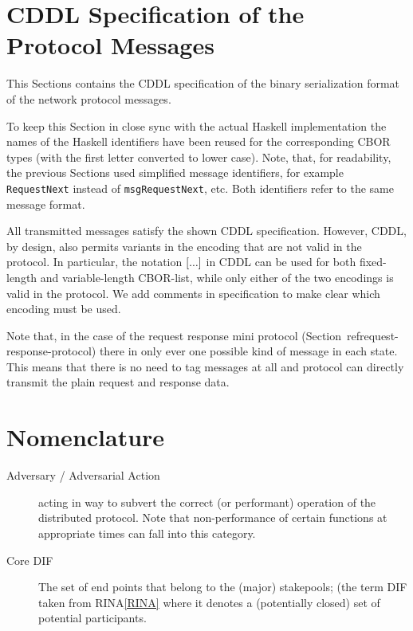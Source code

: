 \documentclass{report}
\newcommand{\wip}[1]{\color{magenta}{#1}\color{black}}
\theoremstyle{definition}{
  \newtheorem{lemma}{Lemma}[section] %
  \newtheorem{definition}[lemma]{Definition}
}
\theoremstyle{theorem}{
  \newtheorem{invariant}[lemma]{Invariant}
  \newtheorem{proofobligation}[lemma]{Proof Obligation}
}
\numberwithin{equation}{lemma}
\begin{document}
\appendix
\section{CDDL Specification of the Protocol Messages}
\label{included-cddl}
\label{CBOR-section}
This Sections contains the CDDL\cite{cddl} specification
of the binary serialization format of the network protocol messages.

To keep this Section in close sync with the actual Haskell implementation
the names of the Haskell identifiers have been reused for the corresponding
CBOR types (with the first letter converted to lower case).
Note, that, for readability, the previous Sections used simplified message identifiers,
for example {\tt RequestNext} instead of {\tt msgRequestNext}, etc.
Both identifiers refer to the same message format.

All transmitted messages satisfy the shown CDDL specification.
However, CDDL, by design, also permits variants in the encoding that are not valid in the protocol.
In particular, the notation ${\tt [} ... {\tt ]}$ in CDDL can be used for both fixed-length  
and variable-length CBOR-list, while only either of the two encodings is valid in the protocol.
We add comments in specification to make clear which encoding must be used.

Note that, in the case of the request response mini protocol (Section~ref{request-response-protocol})
there in only ever one possible kind of message in each state.
This means that there is no need to tag messages at all and protocol can directly transmit the plain
request and response data.

\wip{TODO: test that messages.cddl actually works !}




\section{Nomenclature}
\begin{description}
\item[Adversary / Adversarial Action] acting in way to subvert the
  correct (or performant) operation of the distributed protocol. Note
  that non-performance of certain functions at appropriate times can
  fall into this category.
\item[Core DIF] The set of end points that belong to the (major)
  stakepools; (the term DIF taken from RINA\ref{RINA} where it denotes
  a (potentially closed) set of potential participants.
\end{description}
\end{document}
